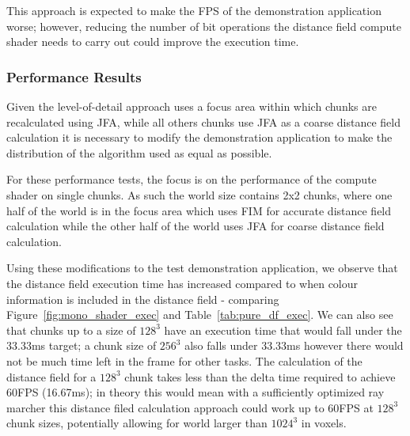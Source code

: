 This approach is expected to make the FPS of the demonstration application worse; however, reducing the number of bit
operations the distance field compute shader needs to carry out could improve the execution time.

\subsubsection{Performance Results}
Given the level-of-detail approach uses a focus area within which chunks are recalculated using JFA, while all others
chunks use JFA as a coarse distance field calculation it is necessary to modify the demonstration application to make
the distribution of the algorithm used as equal as possible.

For these performance tests, the focus is on the performance of the compute shader on single chunks. As such the world
size contains 2x2 chunks, where one half of the world is in the focus area which uses FIM for accurate distance field
calculation while the other half of the world uses JFA for coarse distance field calculation.

Using these modifications to the test demonstration application, we observe that the distance field execution time has
increased compared to when colour information is included in the distance field - comparing
Figure~\ref{fig:mono_shader_exec} and Table~\ref{tab:pure_df_exec}. We can also see that chunks up to a size of
$128^3$ have an execution time that would fall under the 33.33ms target; a chunk size of $256^3$ also falls under 33.33ms
however there would not be much time left in the frame for other tasks. The calculation of the distance field
for a $128^3$ chunk takes less than the delta time required to achieve 60FPS (16.67ms); in theory this would mean with a
sufficiently optimized ray marcher this distance filed calculation approach could work up to 60FPS at $128^3$ chunk
sizes, potentially allowing for world larger than $1024^3$ in voxels.

